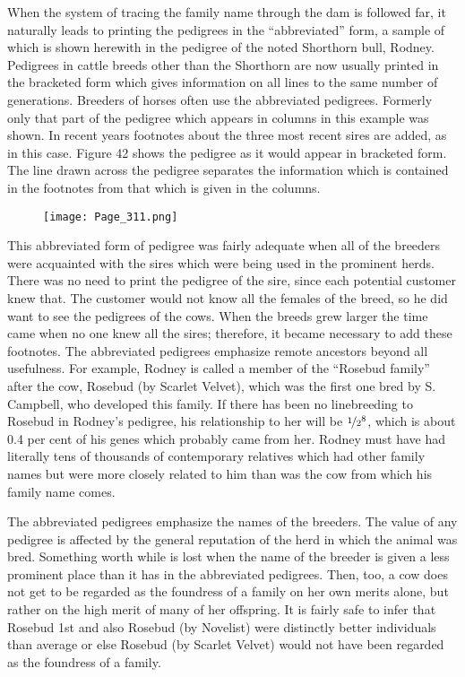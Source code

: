 When the system of tracing the family name through the dam is followed
far, it naturally leads to printing the pedigrees in the ``abbreviated''
form, a sample of which is shown herewith in the pedigree of the
noted Shorthorn bull, Rodney. Pedigrees in cattle breeds other than
the Shorthorn are now usually printed in the bracketed form which
gives information on all lines to the same number of generations.
Breeders of horses often use the abbreviated pedigrees. Formerly only
that part of the pedigree which appears in columns in this example was
shown. In recent years footnotes about the three most recent sires are
added, as in this case. Figure 42 shows the pedigree as it would appear
in bracketed form. The line drawn across the pedigree separates the
information which is contained in the footnotes from that which is
given in the columns.

\begin{figure}
	\centering
    \texttt{[image: Page\_311.png]}
    \label{fig:Lush_Figure_Page_311}
\end{figure}

\nowidow
This abbreviated form of pedigree was fairly adequate when all of
the breeders were acquainted with the sires which were being used in
the prominent herds. There was no need to print the pedigree of the
sire, since each potential customer knew that. The customer would not
know all the females of the breed, so he did want to see the pedigrees of
the cows. When the breeds grew larger the time came when no one
knew all the sires; therefore, it became necessary to add these footnotes.
The abbreviated pedigrees emphasize remote ancestors beyond all usefulness.
For example, Rodney is called a member of the ``Rosebud family''
after the cow, Rosebud (by Scarlet Velvet), which was the first one
bred by S. Campbell, who developed this family. If there has been no
linebreeding to Rosebud in Rodney's pedigree, his relationship to her
will be \(\nicefrac{1}{2}^8\), which is about 0.4 per cent of his genes which probably
came from her. Rodney must have had literally tens of thousands of
contemporary relatives which had other family names but were more
closely related to him than was the cow from which his family name
comes.

The abbreviated pedigrees emphasize the names of the breeders.
The value of any pedigree is affected by the general reputation of the
herd in which the animal was bred. Something worth while is lost when
the name of the breeder is given a less prominent place than it has in
the abbreviated pedigrees. Then, too, a cow does not get to be regarded
as the foundress of a family on her own merits alone, but rather on the
high merit of many of her offspring. It is fairly safe to infer that Rosebud
1st and also Rosebud (by Novelist) were distinctly better individuals
than average or else Rosebud (by Scarlet Velvet) would not have
been regarded as the foundress of a family.

